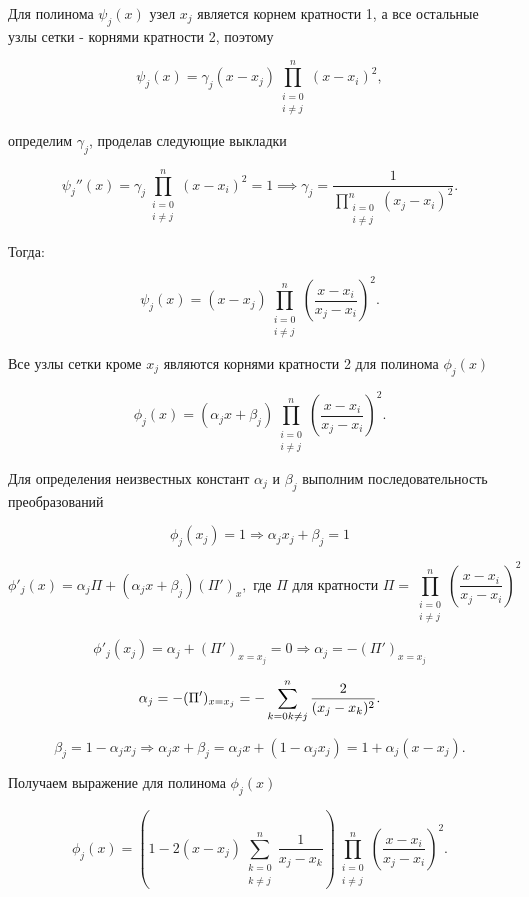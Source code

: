 Для полинома \( \psi_j(x) \) узел \( x_j \) является корнем кратности 1, а все остальные узлы сетки - корнями кратности 2, поэтому

$$\psi_j(x) = \gamma_j(x - x_j) \prod_{\substack{i=0 \\ i \neq j}}^n (x - x_i)^2,$$

определим \( \gamma_j \), проделав следующие выкладки

$$\psi_j''(x) = \gamma_j \prod_{\substack{i=0 \\ i \neq j}}^n (x - x_i)^2 = 1 \implies \gamma_j = \frac{1}{\prod_{\substack{i=0 \\ i \neq j}}^n (x_j - x_i)^2}.$$

Тогда:

$$\psi_j(x) = (x - x_j) \prod_{\substack{i=0 \\ i \neq j}}^n \left( \frac{x - x_i}{x_j - x_i} \right)^2.$$

Все узлы сетки кроме \( x_j \) являются корнями кратности 2 для полинома \( \phi_j(x) \)

$$\phi_j(x) = (\alpha_jx + \beta_j) \prod_{\substack{i=0 \\ i \neq j}}^n \left( \frac{x - x_i}{x_j - x_i} \right)^2.$$

Для определения неизвестных констант \( \alpha_j \) и \( \beta_j \) выполним последовательность преобразований

$$\phi_j(x_j) = 1 \Rightarrow \alpha_jx_j + \beta_j = 1$$

$$\phi'_j(x) = \alpha_j \Pi + (\alpha_jx + \beta_j)(\Pi')_x, \text{ где } \Pi \text{ для кратности } \Pi = \prod_{\substack{i=0 \\ i \neq j}}^n \left( \frac{x - x_i}{x_j - x_i} \right)^2$$

$$\phi'_j(x_j) = \alpha_j + (\Pi')_{x=x_j} = 0 \Rightarrow \alpha_j = -(\Pi')_{x=x_j}$$

$$\alpha_j = -(\Pi')_{x=x_j} = -\sum_{k=0 \\ k \neq j}^n \frac{2}{(x_j - x_k)^2}.$$

$$\beta_j = 1 - \alpha_jx_j \Rightarrow \alpha_jx + \beta_j = \alpha_jx + (1 - \alpha_jx_j) = 1 + \alpha_j(x - x_j).$$

Получаем выражение для полинома \( \phi_j(x) \)

$$\phi_j(x) = \left( 1 - 2(x - x_j) \sum_{\substack{k=0 \\ k \neq j}}^n \frac{1}{x_j - x_k} \right) \prod_{\substack{i=0 \\ i \neq j}}^n \left( \frac{x - x_i}{x_j - x_i} \right)^2.$$


